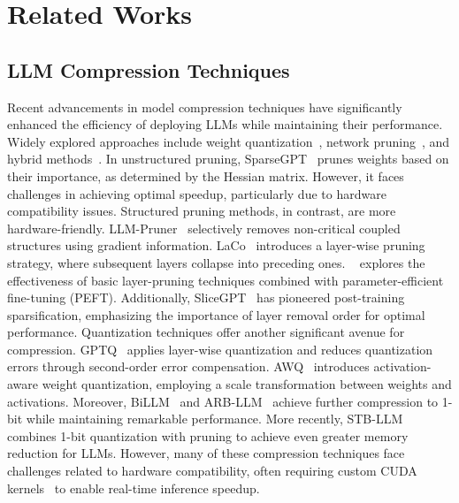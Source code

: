 \section{Related Works}
\vspace{-2mm}
	\subsection{LLM Compression Techniques}
	\vspace{-2mm}
	Recent advancements in model compression techniques have significantly enhanced the efficiency of deploying LLMs while maintaining their performance. Widely explored approaches include weight quantization~\cite{frantar2022gptq, lin2024awq}, network pruning~\cite{frantar2023sparsegpt, ma2023llmpruner, yang2024laco, gromov2024unreasonable, ashkboos2024slicegpt}, and hybrid methods~\cite{dong2024stbllm}.
	In unstructured pruning, SparseGPT~\cite{frantar2023sparsegpt} prunes weights based on their importance, as determined by the Hessian matrix. However, it faces challenges in achieving optimal speedup, particularly due to hardware compatibility issues. Structured pruning methods, in contrast, are more hardware-friendly. LLM-Pruner~\cite{ma2023llmpruner} selectively removes non-critical coupled structures using gradient information. LaCo~\cite{yang2024laco} introduces a layer-wise pruning strategy, where subsequent layers collapse into preceding ones. ~\citet{gromov2024unreasonable} explores the effectiveness of basic layer-pruning techniques combined with parameter-efficient fine-tuning (PEFT). Additionally, SliceGPT~\cite{ashkboos2024slicegpt} has pioneered post-training sparsification, emphasizing the importance of layer removal order for optimal performance.
	Quantization techniques offer another significant avenue for compression. GPTQ~\cite{frantar2022gptq} applies layer-wise quantization and reduces quantization errors through second-order error compensation. AWQ~\cite{lin2024awq} introduces activation-aware weight quantization, employing a scale transformation between weights and activations. Moreover, BiLLM~\cite{huang2024billm} and ARB-LLM~\cite{li2024arb} achieve further compression to 1-bit while maintaining remarkable performance. More recently, STB-LLM~\cite{dong2024stbllm} combines 1-bit quantization with pruning to achieve even greater memory reduction for LLMs.
	However, many of these compression techniques face challenges related to hardware compatibility, often requiring custom CUDA kernels~\cite{dong2024stbllm} to enable real-time inference speedup.
	
